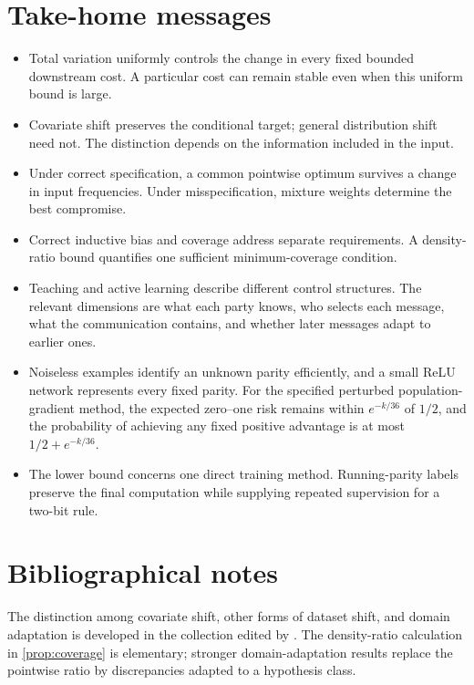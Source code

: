 \documentclass[11pt,twoside]{article}
\theoremstyle{definition}
\theoremstyle{remark}
\begin{document}
\section{Take-home messages}
\label{sec:take-home}

\begin{itemize}[leftmargin=*]
\item Total variation uniformly controls the change in every fixed bounded
downstream cost. A particular cost can remain stable even when this uniform
bound is large.
\item Covariate shift preserves the conditional target; general distribution
shift need not. The distinction depends on the information included in the
input.
\item Under correct specification, a common pointwise optimum survives a
change in input frequencies. Under misspecification, mixture weights determine
the best compromise.
\item Correct inductive bias and coverage address separate requirements. A
density-ratio bound quantifies one sufficient minimum-coverage condition.
\item Teaching and active learning describe different control structures.
The relevant dimensions are what each party knows, who selects each message,
what the communication contains, and whether later messages adapt to earlier
ones.
\item Noiseless examples identify an unknown parity efficiently, and a small
ReLU network represents every fixed parity. For the specified perturbed
population-gradient method, the expected zero--one risk remains within
$e^{-k/36}$ of $1/2$, and the probability of achieving any fixed positive
advantage is at most $1/2+e^{-k/36}$.
\item The lower bound concerns one direct training method. Running-parity
labels preserve the final computation while supplying repeated supervision
for a two-bit rule.
\end{itemize}

\printendnotes

\section*{Bibliographical notes}

The distinction among covariate shift, other forms of dataset shift, and
domain adaptation is developed in the collection edited by
\citet{quinonero2009}. The density-ratio calculation in
\cref{prop:coverage} is elementary; stronger domain-adaptation results replace
the pointwise ratio by discrepancies adapted to a hypothesis class.
\end{document}
